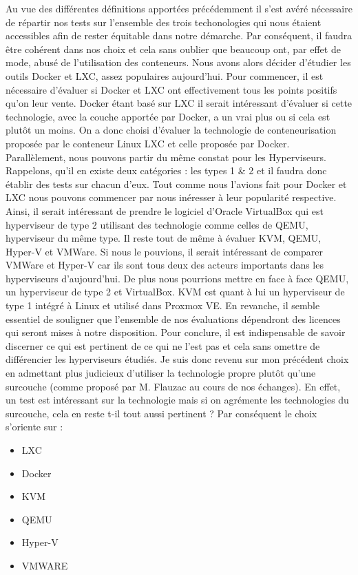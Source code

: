 Au vue des différentes définitions apportées précédemment il s'est avéré nécessaire de répartir nos tests sur l'ensemble des trois techonologies qui nous étaient accessibles afin de rester équitable dans notre démarche. Par conséquent, il faudra être cohérent dans nos choix et cela sans oublier que beaucoup ont, par effet de mode, abusé de l'utilisation des conteneurs. Nous avons alors décider d'étudier les outils Docker et LXC, assez populaires aujourd'hui. Pour commencer, il est nécessaire d'évaluer si Docker et LXC ont effectivement tous les points positifs qu'on leur vente. Docker étant basé sur LXC il serait intéressant d'évaluer si cette technologie, avec la couche apportée par Docker, a un vrai plus ou si cela est plutôt un moins. 
On a donc choisi d'évaluer la technologie de conteneurisation proposée par le conteneur Linux LXC et celle proposée par Docker. 
Parallèlement, nous pouvons partir du même constat pour les Hyperviseurs. Rappelons, qu'il en existe deux catégories : les types 1 \& 2 et il faudra donc établir des tests sur chacun d'eux. Tout comme nous l'avions fait pour Docker et LXC nous pouvons commencer par nous inéresser à leur popularité respective. Ainsi, il serait intéressant de prendre le logiciel d'Oracle VirtualBox qui est hyperviseur de type 2 utilisant des technologie comme celles de QEMU, hyperviseur du même type.  
Il reste tout de même à évaluer KVM, QEMU, Hyper-V et VMWare. Si nous le pouvions, il serait intéressant de comparer VMWare et Hyper-V car ils sont tous deux des acteurs importants dans les hyperviseurs d'aujourd'hui. De plus nous pourrions mettre en face à face QEMU, un hyperviseur de type 2 et VirtualBox. KVM est quant à lui un hyperviseur de type 1 intégré à Linux et utilisé dans Proxmox VE. En revanche, il semble essentiel de souligner que l'ensemble de nos évaluations dépendront des licences qui seront mises à notre disposition.
Pour conclure, il est indispensable de savoir discerner ce qui est pertinent de ce qui ne l'est pas et cela sans omettre de différencier les hyperviseurs étudiés. Je suis donc revenu sur mon précédent choix en admettant plus judicieux d'utiliser la technologie propre plutôt qu'une surcouche (comme proposé par M. Flauzac au cours de nos échanges). En effet, un test est intéressant sur la technologie mais si on agrémente les technologies du surcouche, cela en reste t-il tout aussi pertinent ? 
Par conséquent le choix s'oriente sur :
\begin{itemize}
\item LXC
\item Docker
\item KVM
\item QEMU
\item Hyper-V
\item VMWARE 
\end{itemize}
